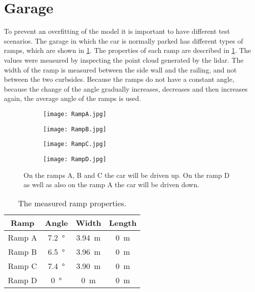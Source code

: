 \section{Garage}
\label{sec:garage}
To prevent an overfitting of the model it is important to have different test scenarios.
The garage in which the car is normally parked has different types of ramps, which are shown in \cref{fig:all_ramps}.
The properties of each ramp are described in \cref{tab:ramp_properties}.
The values were measured by inspecting the point cloud generated by the \gls{lidar}.
The width of the ramp is measured between the side wall and the railing, and not between the two curbsides.
Because the ramps do not have a constant angle, because the change of the angle gradually increases, decreases and then increases again, the average angle of the ramps is used.
\begin{figure}[htb]
	\begin{subfigure}{.24\linewidth}
		\centering
		\texttt{[image: RampA.jpg]}
		\caption{}
	\end{subfigure}
	\hfill
	\begin{subfigure}{.24\linewidth}
		\centering
		\texttt{[image: RampB.jpg]}
		\caption{}
	\end{subfigure}
	\hfill
	\begin{subfigure}{.24\linewidth}
		\centering
		\texttt{[image: RampC.jpg]}
		\caption{}
	\end{subfigure}
	\hfill
	\begin{subfigure}{.24\linewidth}
		\centering
		\texttt{[image: RampD.jpg]}
		\caption{}
	\end{subfigure}
	\caption[Ramps of the garage]{On the ramps A, B and C the car will be driven up. On the ramp D as well as also on the ramp A the car will be driven down.}
	\label{fig:all_ramps}
\end{figure}
\begin{table}[htb]
	\centering
	\caption[Measured ramp properties]{The measured ramp properties.}
	\label{tab:ramp_properties}
	\begin{tabular}[t]{cccc}
		\toprule
		\textbf{Ramp} & \textbf{Angle}    & \textbf{Width}    & \textbf{Length} \\
		\midrule
		Ramp A        & \SI{7.2}{\degree} & \SI{3.94}{\metre} & \SI{0}{\metre}  \\
		Ramp B        & \SI{6.5}{\degree} & \SI{3.96}{\metre} & \SI{0}{\metre}  \\
		Ramp C        & \SI{7.4}{\degree} & \SI{3.90}{\metre} & \SI{0}{\metre}  \\
		Ramp D        & \SI{0}{\degree}   & \SI{0}{\metre}    & \SI{0}{\metre}  \\
		\bottomrule
	\end{tabular}
\end{table}